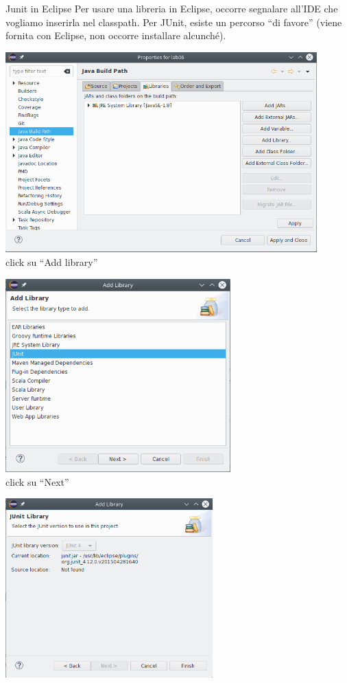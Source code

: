 \documentclass[presentation]{beamer}
\begin{document}
\begin{frame}[allowframebreaks]{Junit in Eclipse}
	Per usare una libreria in Eclipse, occorre segnalare all'IDE che vogliamo inserirla nel classpath. Per JUnit, esiste un percorso ``di favore'' (viene fornita con Eclipse, non occorre installare alcunché).
  \begin{center}
    \includegraphics[width=0.9\textwidth]{junit/e1}\\
    click su ``Add library''
  \end{center}
  \begin{center}
    \includegraphics[width=0.65\textwidth]{junit/e2}\\
    click su ``Next''
  \end{center}
  \begin{center}
    \includegraphics[width=0.6\textwidth]{junit/e3}\\

\end{center}
\end{frame}
\end{document}
